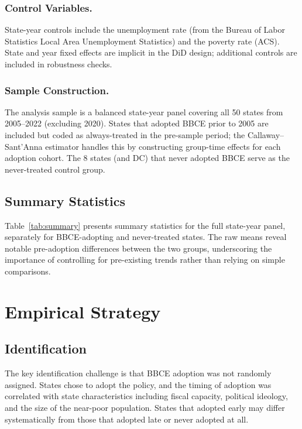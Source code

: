 \documentclass[12pt]{article}
\begin{document}
\subsubsection*{Control Variables.} State-year controls include the unemployment rate (from the Bureau of Labor Statistics Local Area Unemployment Statistics) and the poverty rate (ACS). State and year fixed effects are implicit in the DiD design; additional controls are included in robustness checks.

\subsubsection*{Sample Construction.} The analysis sample is a balanced state-year panel covering all 50 states from 2005--2022 (excluding 2020). States that adopted BBCE prior to 2005 are included but coded as always-treated in the pre-sample period; the Callaway--Sant'Anna estimator handles this by constructing group-time effects for each adoption cohort. The 8 states (and DC) that never adopted BBCE serve as the never-treated control group.

\subsection{Summary Statistics}

Table~\ref{tab:summary} presents summary statistics for the full state-year panel, separately for BBCE-adopting and never-treated states. The raw means reveal notable pre-adoption differences between the two groups, underscoring the importance of controlling for pre-existing trends rather than relying on simple comparisons.



\section{Empirical Strategy}

\subsection{Identification}

The key identification challenge is that BBCE adoption was not randomly assigned. States chose to adopt the policy, and the timing of adoption was correlated with state characteristics including fiscal capacity, political ideology, and the size of the near-poor population. States that adopted early may differ systematically from those that adopted late or never adopted at all.
\end{document}

